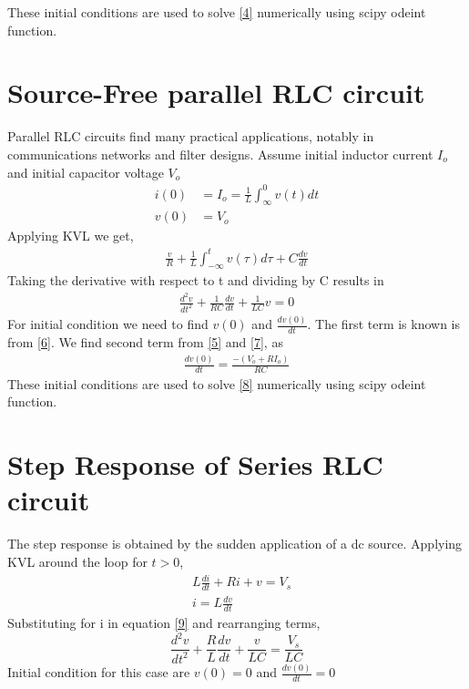 \documentclass[11pt]{article}
\begin{document}
These initial conditions are used to solve \ref{4} numerically using scipy odeint function.

\section{Source-Free parallel RLC circuit}
Parallel RLC circuits find many practical applications, notably in communications networks and filter designs.
Assume initial inductor current $I_o$ and initial capacitor voltage $V_o$ 
\begin{align}
i(0) &= I_o = \frac{1}{L}\int_{\infty}^{0}v(t)dt \label{5}\\
v(0) &= V_o \label{6}
\end{align}
Applying KVL we get,
 \begin{align}
 \frac{v}{R} + \frac{1}{L}\int_{-\infty}^tv(\tau)d\tau + C\frac{dv}{dt} \label{7}
 \end{align}
 Taking the derivative with respect to t and dividing by C results in
 \begin{align}
 \frac{d^2v}{dt^2} + \frac{1}{RC}\frac{dv}{dt} + \frac{1}{LC}v =0 \label{8}
 \end{align}
 For initial condition we need to find $v(0)$ and $\frac{dv(0)}{dt}$. The first term is known is from \ref{6}.
 We find second term from \ref{5} and \ref{7}, as
 \begin{align}
 \frac{dv(0)}{dt} = \frac{-(V_o+RI_o)}{RC}
 \end{align}
 These initial conditions are used to solve \ref{8} numerically using scipy odeint function.

\section{Step Response of Series RLC circuit}
The step response is obtained by the sudden application of a dc source. Applying KVL around the loop for $t>0$,
\begin{align}
 &L\frac{di}{dt} + Ri + v = V_s \label{9} \\
 &i = L\frac{dv}{dt}
\end{align}
 Substituting for i in equation \ref{9}  and rearranging terms,
 $$ \frac{d^2v}{dt^2} + \frac{R}{L}\frac{dv}{dt} + \frac{v}{LC} =  \frac{V_s}{LC} $$
 Initial condition for this case are $v(0) = 0$ and $\frac{dv(0)}{dt} = 0 $
\end{document}
